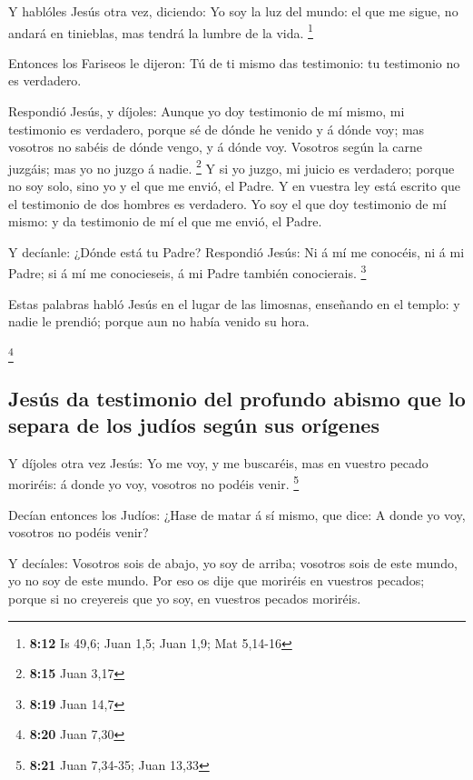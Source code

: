  Y hablóles Jesús otra vez, diciendo: Yo soy la luz del
mundo: el que me sigue, no andará en tinieblas, mas tendrá la lumbre de
la vida. \footnote{\textbf{8:12} Is 49,6; Juan 1,5; Juan 1,9; Mat
  5,14-16}

 Entonces los Fariseos le dijeron: Tú de ti mismo das
testimonio: tu testimonio no es verdadero.

 Respondió Jesús, y díjoles: Aunque yo doy testimonio de mí
mismo, mi testimonio es verdadero, porque sé de dónde he venido y á
dónde voy; mas vosotros no sabéis de dónde vengo, y á dónde voy.
 Vosotros según la carne juzgáis; mas yo no juzgo á nadie.
\footnote{\textbf{8:15} Juan 3,17}  Y si yo juzgo, mi
juicio es verdadero; porque no soy solo, sino yo y el que me envió, el
Padre.  Y en vuestra ley está escrito que el testimonio de
dos hombres es verdadero.  Yo soy el que doy testimonio de
mí mismo: y da testimonio de mí el que me envió, el Padre.

 Y decíanle: ¿Dónde está tu Padre? Respondió Jesús: Ni á mí
me conocéis, ni á mi Padre; si á mí me conocieseis, á mi Padre también
conocierais. \footnote{\textbf{8:19} Juan 14,7}

 Estas palabras habló Jesús en el lugar de las limosnas,
enseñando en el templo: y nadie le prendió; porque aun no había venido
su hora.

\footnote{\textbf{8:20} Juan 7,30}

\hypertarget{jesuxfas-da-testimonio-del-profundo-abismo-que-lo-separa-de-los-juduxedos-seguxfan-sus-oruxedgenes}{%
\subsection{Jesús da testimonio del profundo abismo que lo separa de los
judíos según sus
orígenes}\label{jesuxfas-da-testimonio-del-profundo-abismo-que-lo-separa-de-los-juduxedos-seguxfan-sus-oruxedgenes}}

 Y díjoles otra vez Jesús: Yo me voy, y me buscaréis, mas
en vuestro pecado moriréis: á donde yo voy, vosotros no podéis venir.
\footnote{\textbf{8:21} Juan 7,34-35; Juan 13,33}

 Decían entonces los Judíos: ¿Hase de matar á sí mismo, que
dice: A donde yo voy, vosotros no podéis venir?

 Y decíales: Vosotros sois de abajo, yo soy de arriba;
vosotros sois de este mundo, yo no soy de este mundo.  Por
eso os dije que moriréis en vuestros pecados; porque si no creyereis que
yo soy, en vuestros pecados moriréis.

